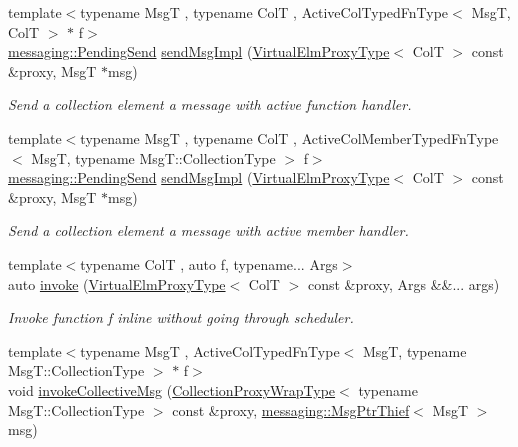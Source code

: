 \begin{DoxyCompactItemize}
{\footnotesize template$<$typename MsgT , typename ColT , Active\+Col\+Typed\+Fn\+Type$<$ Msg\+T, Col\+T $>$ $\ast$ f$>$ }\\\hyperlink{structvt_1_1messaging_1_1_pending_send}{messaging\+::\+Pending\+Send} \hyperlink{structvt_1_1vrt_1_1collection_1_1_collection_manager_afc14691c6992cc5d7e51118b1386b67c}{send\+Msg\+Impl} (\hyperlink{namespacevt_1_1vrt_a620a5c8c59d13e513f690c74b4af516f}{Virtual\+Elm\+Proxy\+Type}$<$ ColT $>$ const \&proxy, MsgT $\ast$msg)
\begin{DoxyCompactList}\small\item\em Send a collection element a message with active function handler. \end{DoxyCompactList}\item 
{\footnotesize template$<$typename MsgT , typename ColT , Active\+Col\+Member\+Typed\+Fn\+Type$<$ Msg\+T, typename Msg\+T\+::\+Collection\+Type $>$ f$>$ }\\\hyperlink{structvt_1_1messaging_1_1_pending_send}{messaging\+::\+Pending\+Send} \hyperlink{structvt_1_1vrt_1_1collection_1_1_collection_manager_afc14691c6992cc5d7e51118b1386b67c}{send\+Msg\+Impl} (\hyperlink{namespacevt_1_1vrt_a620a5c8c59d13e513f690c74b4af516f}{Virtual\+Elm\+Proxy\+Type}$<$ ColT $>$ const \&proxy, MsgT $\ast$msg)
\begin{DoxyCompactList}\small\item\em Send a collection element a message with active member handler. \end{DoxyCompactList}\item 
{\footnotesize template$<$typename ColT , auto f, typename... Args$>$ }\\auto \hyperlink{structvt_1_1vrt_1_1collection_1_1_collection_manager_a2bb9d571a4d12813314264dfe0d5d52f}{invoke} (\hyperlink{namespacevt_1_1vrt_a620a5c8c59d13e513f690c74b4af516f}{Virtual\+Elm\+Proxy\+Type}$<$ ColT $>$ const \&proxy, Args \&\&... args)
\begin{DoxyCompactList}\small\item\em Invoke function \textquotesingle{}f\textquotesingle{} inline without going through scheduler. \end{DoxyCompactList}\item 
{\footnotesize template$<$typename MsgT , Active\+Col\+Typed\+Fn\+Type$<$ Msg\+T, typename Msg\+T\+::\+Collection\+Type $>$ $\ast$ f$>$ }\\void \hyperlink{structvt_1_1vrt_1_1collection_1_1_collection_manager_aecbe91648c89bff4635fbd782ccd458a}{invoke\+Collective\+Msg} (\hyperlink{structvt_1_1vrt_1_1collection_1_1_collection_manager_a56458ed7f9bb22b631b9b3a745f42f94}{Collection\+Proxy\+Wrap\+Type}$<$ typename Msg\+T\+::\+Collection\+Type $>$ const \&proxy, \hyperlink{structvt_1_1messaging_1_1_msg_ptr_thief}{messaging\+::\+Msg\+Ptr\+Thief}$<$ MsgT $>$ msg)

\end{DoxyCompactItemize}
